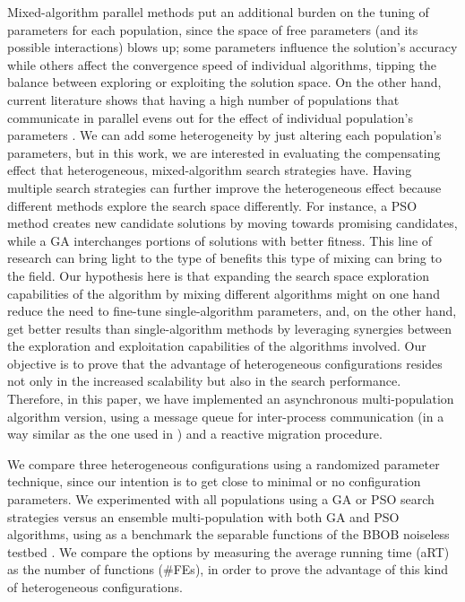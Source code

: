\documentclass[runningheads]{llncs}
\begin{document}
Mixed-algorithm parallel methods put an
additional burden on the tuning of parameters for each population,
since the space of free parameters (and its possible interactions)
blows up; some
parameters influence the solution's accuracy while others affect the convergence
speed of individual algorithms, tipping the balance between exploring or
exploiting the solution space. On the other hand, current literature shows that
having a high number of populations that communicate in parallel
evens out for the effect of individual population's parameters
\cite{li2016multi,tanabe2013evaluation}. We can add some heterogeneity 
by just altering each population's parameters, but in this work,
we are interested in evaluating the compensating effect that
heterogeneous, mixed-algorithm search strategies have. 
Having multiple search strategies can further improve the heterogeneous effect
because different methods explore the search space differently. For instance, a
PSO method creates new candidate solutions by moving towards promising
candidates, while a GA interchanges portions of solutions with better fitness.
This line of research can bring light to the type of benefits this type of
mixing can bring to the field.
Our hypothesis here is that expanding the search space exploration
capabilities of the algorithm by mixing different algorithms might on
one hand reduce the need to fine-tune single-algorithm parameters,
and, on the other hand, get better results than single-algorithm
methods by leveraging synergies between the exploration and
exploitation capabilities of the algorithms involved. Our objective is to prove that
the advantage of heterogeneous configurations resides not only in the increased
scalability but also in the search performance.
Therefore, in this paper, we  have implemented an asynchronous
multi-population algorithm version, using a message queue for inter-process
communication (in a way similar as the one used in
\cite{guervos2018introducing}) and a reactive migration procedure.

We compare three heterogeneous configurations using a randomized
parameter technique, since our intention is to get close to minimal or
no configuration parameters.  We experimented with all populations
using a GA or PSO search strategies versus an ensemble
multi-population with both GA and PSO algorithms, using as a benchmark
the separable functions of the BBOB noiseless testbed
\cite{hansen2009real}. We compare the options by measuring the average
running time (aRT) as the number of functions (\#FEs), in order to
prove the advantage of this kind of heterogeneous configurations.
\end{document}

